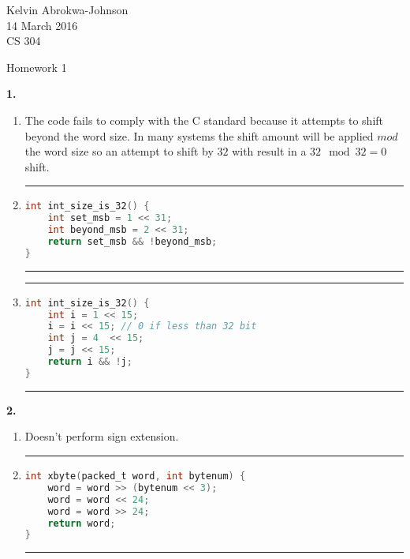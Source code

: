 \documentclass[11pt]{article} %
\newcommand{\hr}{\noindent\rule{14cm}{0.4pt}}
\begin{document}
 

\noindent Kelvin Abrokwa-Johnson \\
14 March 2016 \\
CS 304

\begin{center} Homework 1 \end{center}


{\bf 1.}

\begin{enumerate}[label=\alph*)]

\item
The code fails to comply with the C standard because it attempts to shift beyond the word size. In many systems the shift amount will be applied $mod$ the word size so an attempt to shift by $32$ with result in a $32 \mod 32 = 0$ shift.

\item
\hr
\begin{lstlisting}[language=C]
int int_size_is_32() {
	int set_msb = 1 << 31;
	int beyond_msb = 2 << 31;
	return set_msb && !beyond_msb;
}
\end{lstlisting}
\hr


\item
\hr
\begin{lstlisting}[language=C]
int int_size_is_32() {
	int i = 1 << 15;
	i = i << 15; // 0 if less than 32 bit
	int j = 4  << 15;
	j = j << 15;
	return i && !j;
}
\end{lstlisting}
\hr
\end{enumerate}




\vspace{0.5in}
{\bf 2.}

\begin{enumerate}[label=\alph*)]


\item 
Doesn't perform sign extension.

\item
\hr
\begin{lstlisting}[language=C]
int xbyte(packed_t word, int bytenum) {
	word = word >> (bytenum << 3);
	word = word << 24;
	word = word >> 24;
	return word;
}
\end{lstlisting}
\hr
\end{enumerate}
\end{document}
